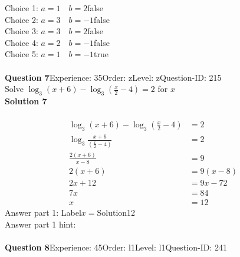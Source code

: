 \documentclass{article}
\begin{document}
Choice 1: \hspace{20pt}$a=1\quad b=2$\hspace{20pt}false\\
Choice 2: \hspace{20pt}$a=3 \quad b=-1$\hspace{20pt}false\\
Choice 3: \hspace{20pt}$a=3 \quad b=2$\hspace{20pt}false\\
Choice 4: \hspace{20pt}$a=2 \quad b=-1$\hspace{20pt}false\\
Choice 5: \hspace{20pt}$a=1 \quad b=-1$\hspace{20pt}true\\
\\[4pt]
\noindent\textbf{Question 7}\hspace{20pt}Experience: 35\hspace{20pt}Order: z\hspace{20pt}Level: z\hspace{20pt}Question-ID: 215\\[2pt]
Solve $\log_{3}(x+6)-\log_{3}\left(\displaystyle\frac{x}{2}-4\right)=2$ for $x$\\[4pt]
\noindent\textbf{Solution 7}\\[2pt]
\\[-35pt]\begin{align*}
\log_{3}(x+6)-\log_{3}\left(\displaystyle\frac{x}{2}-4\right)&=2\\[2pt]
\log_{3}\displaystyle\frac{x+6}{\left(\displaystyle\frac{x}{2}-4\right)}&=2\\[2pt]
\displaystyle\frac{2(x+6)}{x-8}&=9\\[2pt]
2(x+6)&=9(x-8)\\[2pt]
2x+12&=9x-72\\[2pt]
7x&=84\\[2pt]
x&=12
\end{align*}
Answer part 1: \hspace{10pt}Label\hspace{10pt}$x=$\hspace{10pt}Solution\hspace{10pt}12\\
Answer part 1 hint: \hspace{15pt}\\
\\[4pt]
\noindent\textbf{Question 8}\hspace{20pt}Experience: 45\hspace{20pt}Order: l1\hspace{20pt}Level: l1\hspace{20pt}Question-ID: 241\\[2pt]
\end{document}
